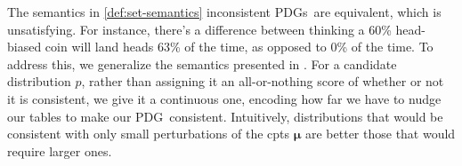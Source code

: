 \documentclass{article}
\newcommand{\bmu}{\boldsymbol{\mu}}
\newcommand{\V}{\mathcal V}
\newcommand{\MN}{PDG}
\newcommand{\MNs}{\MN s}
\numberwithin{equation}{section}
\begin{document}
\begin{notfocus}
	The semantics in \cref{def:set-semantics} inconsistent \MNs\ are equivalent, which is unsatisfying. 
	For instance, there's a difference between thinking a 60\% head-biased coin will land heads 63\% of the time, as opposed to 0\% of the time. %
 	To address this, we generalize the semantics presented in . 
 	For a candidate distribution $p$,
	rather than assigning it an all-or-nothing score of whether or not it is consistent, we give it a continuous one, encoding how far we have to nudge our tables to make our \MN\ consistent. Intuitively, distributions that would be consistent with only small perturbations of the cpts $\bmu$ are better those that would require larger ones. 

\end{notfocus}
\end{document}
